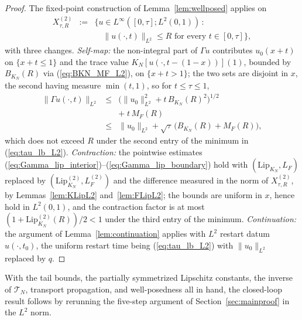 \documentclass[amsthm]{autart}
\theoremstyle{plain}
\theoremstyle{definition}
\newcommand{\Tcal}{\mathcal{T}}
\newcommand{\Linf}{L^\infty}
\newcommand{\Ltwo}{L^2}
\newcommand{\LipKn}{\mathrm{Lip}_{K_N}}
\begin{document}
\begin{proof}
The fixed-point construction of Lemma~\ref{lem:wellposed} applies on
\begin{eqnarray}
X^{(2)}_{\tau,R} &:=& \bigl\{u \in \Linf([0,\tau]; \Ltwo(0,1)) \,:\, \nonumber \\
&& \quad \|u(\cdot,t)\|_{\Ltwo} \le R \text{ for every } t \in [0,\tau]\bigr\},
\label{eq:X2def}
\end{eqnarray}
with three changes. \emph{Self-map:} the non-integral part of $\Gamma u$ contributes $u_0(x+t)$ on $\{x + t \le 1\}$ and the trace value $K_N[u(\cdot, t-(1-x))](1)$, bounded by $B_{K_N}(R)$ via (\ref{eq:BKN_MF_L2}), on $\{x + t > 1\}$; the two sets are disjoint in $x$, the second having measure $\min(t,1)$, so for $t \le \tau \le 1$,
\begin{eqnarray}
\|\Gamma u(\cdot,t)\|_{\Ltwo} &\le& \bigl(\|u_0\|_{\Ltwo}^2 + t\, B_{K_N}(R)^2\bigr)^{1/2} \nonumber \\
&& +\; t\, M_F(R) \nonumber \\
&\le& \|u_0\|_{\Ltwo} + \sqrt{\tau}\,\bigl(B_{K_N}(R) + M_F(R)\bigr),
\label{eq:selfmapL2}
\end{eqnarray}
which does not exceed $R$ under the second entry of the minimum in (\ref{eq:tau_lb_L2}). \emph{Contraction:} the pointwise estimates (\ref{eq:Gamma_lip_interior})--(\ref{eq:Gamma_lip_boundary}) hold with $(\LipKn, L_F)$ replaced by $(\LipKn^{(2)}, L_F^{(2)})$ and the difference measured in the norm of $X^{(2)}_{\tau,R}$, by Lemmas~\ref{lem:KLipL2} and~\ref{lem:FLipL2}; the bounds are uniform in $x$, hence hold in $\Ltwo(0,1)$, and the contraction factor is at most $(1 + \LipKn^{(2)}(R))/2 < 1$ under the third entry of the minimum. \emph{Continuation:} the argument of Lemma~\ref{lem:continuation} applies with $\Ltwo$ restart datum $u(\cdot,t_0)$, the uniform restart time being (\ref{eq:tau_lb_L2}) with $\|u_0\|_{\Ltwo}$ replaced by $q$.
\end{proof}

With the tail bounds, the partially symmetrized Lipschitz constants, the inverse of $\Tcal_N$, transport propagation, and well-posedness all in hand, the closed-loop result follows by rerunning the five-step argument of Section~\ref{sec:mainproof} in the $\Ltwo$ norm.
\end{document}
